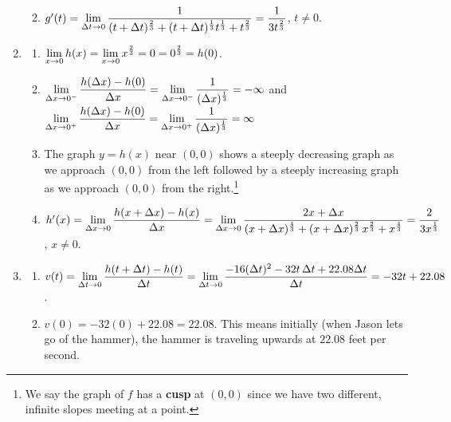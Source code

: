\documentclass{ximera}
\begin{document}
\begin{enumerate}
\begin{enumerate}
\smallskip

\item   $g'(t) = \ds{ \lim_{\Delta t \rightarrow 0} \dfrac{1}{(t+\Delta t)^{\frac{2}{3}} + (t+\Delta t)^{\frac{1}{3}} t^{\frac{1}{3}} + t^{\frac{2}{3}}} = \dfrac{1}{3 t^{\frac{2}{3}}} }$, $t \neq 0$.

\end{enumerate}

\item \begin{enumerate}  \item $\ds{\lim_{x \rightarrow 0} h(x) = \lim_{x \rightarrow 0} x^{\frac{2}{3}} = 0 = 0^{\frac{2}{3}} = h(0)}$. 

\item $\ds{\lim_{\Delta x \rightarrow 0^{-}} \dfrac{h(\Delta x) - h(0)}{\Delta x} = \lim_{\Delta x \rightarrow 0^{-}} \dfrac{1}{(\Delta x)^{\frac{1}{3}}} = -\infty}$ and  $\ds{\lim_{\Delta x \rightarrow 0^{+}} \dfrac{h(\Delta x) - h(0)}{\Delta x} = \lim_{\Delta x \rightarrow 0^{+}} \dfrac{1}{(\Delta x)^{\frac{1}{3}}} = \infty}$

\smallskip
        
\item  The graph $y = h(x)$ near $(0,0)$ shows a steeply decreasing graph as we approach $(0,0)$ from the left followed by a steeply increasing graph as we approach $(0,0)$ from the right.\footnote{We say the graph of $f$ has a  \textbf{cusp} at $(0,0)$ since we have two different, infinite slopes meeting at a point.}

\smallskip

\item  $h'(x) =  \ds{\lim_{\Delta x \rightarrow 0} \dfrac{h(x+\Delta x) - h(x)}{\Delta x} = \lim_{\Delta x \rightarrow 0} \dfrac{2x + \Delta x}{(x+\Delta x)^{\frac{4}{3}} + (x+\Delta x)^{\frac{2}{3}} \, x^{\frac{2}{3}} + x^{\frac{4}{3}}} = \dfrac{2}{3x^{\frac{1}{3}}}}$, $x \neq 0$.
\end{enumerate}

\item  \begin{enumerate}

\item  $v(t) = \ds{\lim_{\Delta t \rightarrow 0} \dfrac{h(t + \Delta t) - h(t)}{\Delta t} = \lim_{\Delta t \rightarrow 0} \dfrac{-16(\Delta t)^2 -32 t \, \Delta t + 22.08 \Delta t}{\Delta t}  = -32t + 22.08}$.

\item   $v(0) = -32(0) + 22.08 = 22.08$. This means initially (when Jason lets go of the hammer), the hammer is traveling upwards at $22.08$ feet per second.


\end{enumerate}
\end{enumerate}
\end{document}
